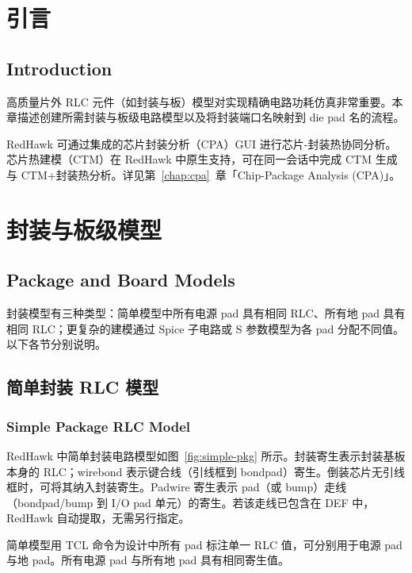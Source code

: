 ﻿%
\label{chap:pkg}

\section{引言}
\subsection*{Introduction}

高质量片外 RLC 元件（如封装与板）模型对实现精确电路功耗仿真非常重要。本章描述创建所需封装与板级电路模型以及将封装端口名映射到 die pad 名的流程。

RedHawk 可通过集成的芯片封装分析（CPA）GUI 进行芯片-封装热协同分析。芯片热建模（CTM）在 RedHawk 中原生支持，可在同一会话中完成 CTM 生成与 CTM+封装热分析。详见第~\ref{chap:cpa}~章「Chip-Package Analysis (CPA)」。

\section{封装与板级模型}
\subsection*{Package and Board Models}

封装模型有三种类型：简单模型中所有电源 pad 具有相同 RLC、所有地 pad 具有相同 RLC；更复杂的建模通过 Spice 子电路或 S 参数模型为各 pad 分配不同值。以下各节分别说明。

\subsection{简单封装 RLC 模型}
\subsubsection*{Simple Package RLC Model}

RedHawk 中简单封装电路模型如图~\ref{fig:simple-pkg} 所示。封装寄生表示封装基板本身的 RLC；wirebond 表示键合线（引线框到 bondpad）寄生。倒装芯片无引线框时，可将其纳入封装寄生。Padwire 寄生表示 pad（或 bump）走线（bondpad/bump 到 I/O pad 单元）的寄生。若该走线已包含在 DEF 中，RedHawk 自动提取，无需另行指定。


简单模型用 TCL 命令为设计中所有 pad 标注单一 RLC 值，可分别用于电源 pad 与地 pad。所有电源 pad 与所有地 pad 具有相同寄生值。

